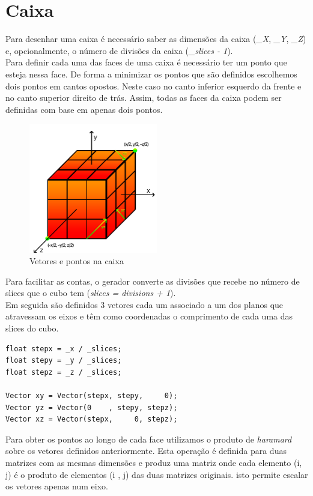 \documentclass[a4paper]{report}
\begin{document}
\section{Caixa}
Para desenhar uma caixa é necessário saber as dimensões da caixa (\textit{\_X},
\textit{\_Y}, \textit{\_Z}) e, opcionalmente, o número de divisões da caixa
(\textit{\_slices - 1}).\\
Para definir cada uma das faces de uma caixa é necessário ter um ponto que
esteja nessa face. De forma a minimizar os pontos que são definidos escolhemos
dois pontos em cantos opostos. Neste caso no canto inferior esquerdo da frente e
no canto superior direito de trás. Assim, todas as faces da caixa podem ser
definidas com base em apenas dois pontos.\\
\begin{figure}[H]
    \centering 
    \includegraphics[width=0.5\textwidth]{images/cubo_vectors.png}  
    \caption{Vetores e pontos na caixa}
    \label{fig:box_vectors}
\end{figure}
Para facilitar as contas, o gerador converte as divisões que recebe no número de
slices que o cubo tem (\textit{slices = divisions + 1}).\\
Em seguida são definidos 3 vetores cada um associado a um dos planos que
atravessam os eixos e têm como coordenadas o comprimento de cada uma das slices
do cubo.\\
\begin{lstlisting}
float stepx = _x / _slices;
float stepy = _y / _slices;
float stepz = _z / _slices;

Vector xy = Vector(stepx, stepy,     0);
Vector yz = Vector(0    , stepy, stepz);
Vector xz = Vector(stepx,     0, stepz);
\end{lstlisting}
Para obter os pontos ao longo de cada face utilizamos o produto de
\textit{haramard} sobre os vetores definidos anteriormente. Esta operação é
definida para duas matrizes com as mesmas dimensões e produz uma matriz onde
cada elemento (i, j) é o produto de elementos (i , j) das duas matrizes
originais. isto permite escalar os vetores apenas num eixo.\\
\end{document}

